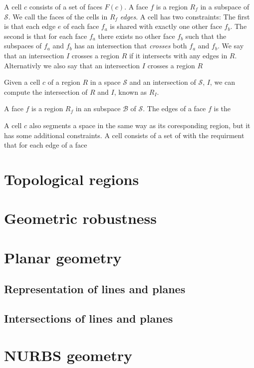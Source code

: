 \documentclass[a4paper]{article}
\theoremstyle{definition}
\begin{document}
A cell $c$ consists of a set of faces $F(c)$.
A face $f$ is a region $R_f$ in a subspace of $\mathcal{S}$. 
We call the faces of the cells in $R_f$ \emph{edges}.
A cell has two constraints:
The first is that each edge $e$ of each face $f_a$ is shared with exactly one other face $f_b$.
The second is that for each face $f_a$ there exists no other face $f_b$ such that the subspaces of $f_a$ and $f_b$ has an intersection that \emph{crosses} both $f_a$ and $f_b$.
We say that an intersection $I$ crosses a region $R$ if it intersects with any edges in $R$.
Alternativly we also say that an intersection $I$ crosses a region $R$

Given a cell $c$ of a region $R$ in a space $\mathcal{S}$ and an intersection of $\mathcal{S}$, $I$, we can compute the intersection of $R$ and $I$, known as $R_I$.

A face $f$ is a region $R_f$ in an subspace $\mathcal{B}$ of $\mathcal{S}$.
The edges of a face $f$ is the 

A cell $c$ also segments a space in the same way as its coresponding region, but it has some additional constraints. A cell consists of a set of  with the requirment that for each edge of a face

\section{Topological regions}

\section{Geometric robustness}

\section{Planar geometry}

\subsection{Representation of lines and planes}
\subsection{Intersections of lines and planes}

\section{NURBS geometry}
\end{document}
